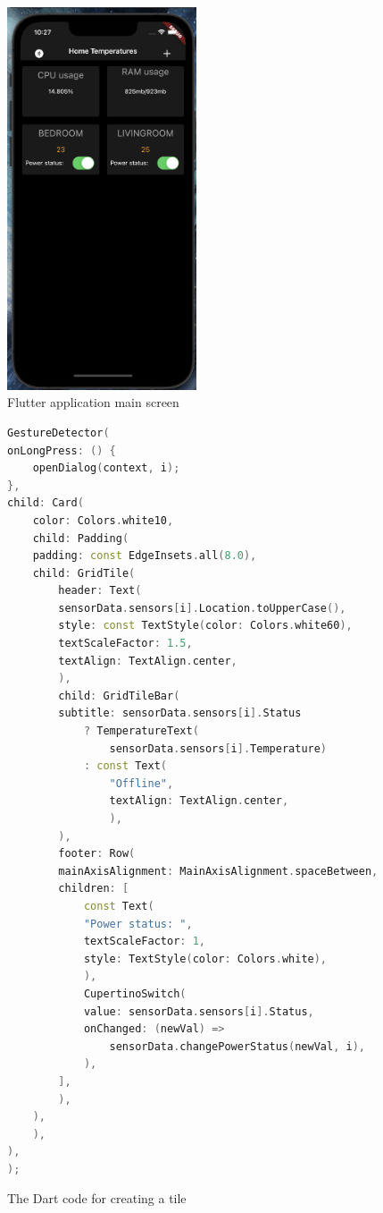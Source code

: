 \begin{figure}[H]
    \centering
    \includegraphics[width=0.5\textwidth]{img/homeScreen.png} 
    \caption{Flutter application main screen}
    \label{fig:appHome}
\end{figure}

\begin{figure}[H]
    \begin{lstlisting}[language=c++]
GestureDetector(
onLongPress: () {
    openDialog(context, i);
},
child: Card(
    color: Colors.white10,
    child: Padding(
    padding: const EdgeInsets.all(8.0),
    child: GridTile(
        header: Text(
        sensorData.sensors[i].Location.toUpperCase(),
        style: const TextStyle(color: Colors.white60),
        textScaleFactor: 1.5,
        textAlign: TextAlign.center,
        ),
        child: GridTileBar(
        subtitle: sensorData.sensors[i].Status
            ? TemperatureText(
                sensorData.sensors[i].Temperature)
            : const Text(
                "Offline",
                textAlign: TextAlign.center,
                ),
        ),
        footer: Row(
        mainAxisAlignment: MainAxisAlignment.spaceBetween,
        children: [
            const Text(
            "Power status: ",
            textScaleFactor: 1,
            style: TextStyle(color: Colors.white),
            ),
            CupertinoSwitch(
            value: sensorData.sensors[i].Status,
            onChanged: (newVal) =>
                sensorData.changePowerStatus(newVal, i),
            ),
        ],
        ),
    ),
    ),
),
);

\end{lstlisting}
    \caption{The Dart code for creating a tile}
    \label{code:app:tile}
\end{figure}

